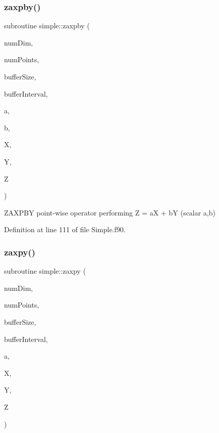\subsubsection{\texorpdfstring{zaxpby()}{zaxpby()}}
{\footnotesize\ttfamily subroutine simple\+::zaxpby (\begin{DoxyParamCaption}\item[{integer(kind=4), intent(in)}]{num\+Dim,  }\item[{integer(kind=8), intent(in)}]{num\+Points,  }\item[{integer(kind=8), dimension(numdim), intent(in)}]{buffer\+Size,  }\item[{integer(kind=8), dimension(2$\ast$numdim), intent(in)}]{buffer\+Interval,  }\item[{real(kind=8), intent(in)}]{a,  }\item[{real(kind=8), intent(in)}]{b,  }\item[{real(kind=8), dimension(numpoints), intent(in)}]{X,  }\item[{real(kind=8), dimension(numpoints), intent(in)}]{Y,  }\item[{real(kind=8), dimension(numpoints), intent(out)}]{Z }\end{DoxyParamCaption})}



Z\+A\+X\+P\+BY point-\/wise operator performing Z = aX + bY (scalar a,b) 



Definition at line 111 of file Simple.\+f90.

\hypertarget{namespacesimple_a0f40a3b234ef053114049300e1e66c7f}{}\label{namespacesimple_a0f40a3b234ef053114049300e1e66c7f} 
\subsubsection{\texorpdfstring{zaxpy()}{zaxpy()}}
{\footnotesize\ttfamily subroutine simple\+::zaxpy (\begin{DoxyParamCaption}\item[{integer(kind=4), intent(in)}]{num\+Dim,  }\item[{integer(kind=8), intent(in)}]{num\+Points,  }\item[{integer(kind=8), dimension(numdim), intent(in)}]{buffer\+Size,  }\item[{integer(kind=8), dimension(2$\ast$numdim), intent(in)}]{buffer\+Interval,  }\item[{real(kind=8), intent(in)}]{a,  }\item[{real(kind=8), dimension(numpoints), intent(in)}]{X,  }\item[{real(kind=8), dimension(numpoints), intent(in)}]{Y,  }\item[{real(kind=8), dimension(numpoints), intent(out)}]{Z }\end{DoxyParamCaption})}



